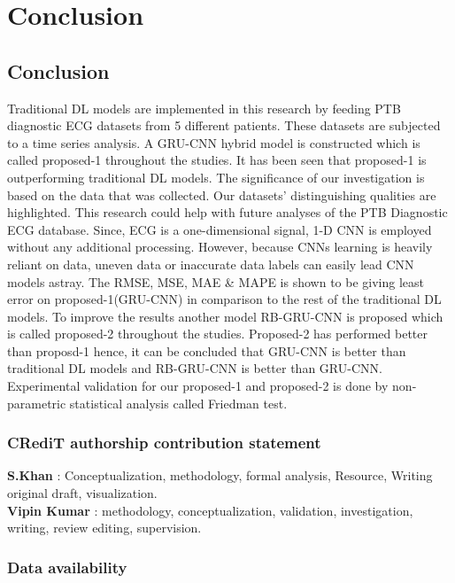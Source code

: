 
\chapter{Conclusion} %

\label{c6} %

\section{Conclusion}
Traditional DL models are implemented in this research by feeding PTB diagnostic ECG datasets from 5 different patients. These datasets are subjected to a time series analysis. A GRU-CNN hybrid model is constructed which is called proposed-1 throughout the studies. It has been seen that proposed-1 is outperforming traditional DL models. The significance of our investigation is based on the data that was collected. Our datasets' distinguishing qualities are highlighted. This research could help with future analyses of the PTB Diagnostic ECG database. Since, ECG is a one-dimensional signal,  1-D CNN is employed without any additional processing. However,  because CNNs learning is heavily reliant on data,  uneven data or inaccurate data labels can easily lead CNN models astray. The RMSE, MSE, MAE \& MAPE is shown to be giving least error on proposed-1(GRU-CNN) in comparison to the rest of the traditional DL models. To improve the results another model RB-GRU-CNN is proposed which is called proposed-2 throughout the studies. Proposed-2 has performed better than proposd-1 hence,  it can be concluded that GRU-CNN is better than traditional DL models and RB-GRU-CNN is better than GRU-CNN. Experimental validation for our proposed-1 and proposed-2 is done by non-parametric statistical analysis called Friedman test. 

\subsection*{CRediT authorship contribution statement}

\textbf{S.Khan} : Conceptualization, methodology, formal analysis, Resource, Writing original draft, visualization.\\
\textbf{Vipin Kumar} : methodology, conceptualization, validation, investigation, writing, review editing, supervision.

\subsection*{Data availability}



